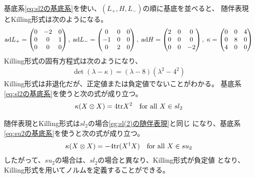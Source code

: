 {	\begin{example}[sl(2)]\label{eg:sl(2)の随伴表現} %
		基底系\eqref{eq:sl2の基底系}を使い、$(L_+,H,L_-)$の順に基底を並べると、
		随伴表現とKilling形式は次のようになる。
		\begin{equation*}\begin{split}
			{\ensuremath{\operatorname{ad}}} L_+ = \begin{pmatrix}
				0 & -2 & 0 \\ 0 & 0 & 1 \\ 0 & 0 & 0
			\end{pmatrix},\; {\operatorname{ad}} L_- = \begin{pmatrix}
				0 & 0 & 0 \\ -1 & 0 & 0 \\ 0 & 2 & 0
			\end{pmatrix},\; {\operatorname{ad}} H = \begin{pmatrix}
				2 & 0 & 0 \\ 0 & 0 & 0 \\ 0 & 0 & -2
			\end{pmatrix},\; \kappa = \begin{pmatrix}
				0 & 0 & 4 \\ 0 & 8 & 0 \\ 4 & 0 & 0
			\end{pmatrix}
		\end{split}\end{equation*}
		Killing形式の固有方程式は次のようになり、
		\begin{equation*}\begin{split}
			\det(\lambda - \kappa) = (\lambda - 8)(\lambda^2 - 4^2)
		\end{split}\end{equation*}
		Killing形式は非退化だが、正定値または負定値でないことがわかる。
		基底系\eqref{eq:sl2の基底系}を使うと次の式が成り立つ。
		\begin{equation*}\begin{split}
			\kappa(X\otimes X) = 4{\operatorname{tr}} X^2 \quad\text{for all } X\in sl_2
		\end{split}\end{equation*}
	\end{example} %

	\begin{example}[su(2)]\label{eg:su(2)の随伴表現} %
		随伴表現とKilling形式は$sl_2$の場合\ref{eg:sl(2)の随伴表現}と同じ
		になり、基底系\eqref{eq:su2の基底系}を使うと次の式が成り立つ。
		\begin{equation*}\begin{split}
			\kappa(X\otimes X) = - 4{\operatorname{tr}}(X^\dag X) \quad\text{for all } X\in su_2
		\end{split}\end{equation*}
		したがって、$su_2$の場合は、$sl_2$の場合と異なり、Killing形式が負定値
		となり、Killing形式を用いてノルムを定義することができる。
	\end{example} %

}
